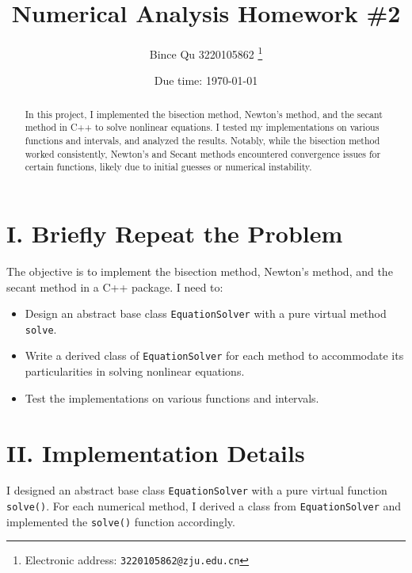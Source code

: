 \documentclass[a4paper]{article}
\begin{document}
\title{Numerical Analysis Homework \#2}

\author{Bince Qu 3220105862
  \thanks{Electronic address: \texttt{3220105862@zju.edu.cn}}}

\date{Due time: \today}

\maketitle

\begin{abstract}
    In this project, I implemented the bisection method, Newton's method, and the secant method in C++ to solve nonlinear equations. I tested my implementations on various functions and intervals, and analyzed the results. Notably, while the bisection method worked consistently, Newton's and Secant methods encountered convergence issues for certain functions, likely due to initial guesses or numerical instability.
\end{abstract}

\section*{I. Briefly Repeat the Problem}

The objective is to implement the bisection method, Newton's method, and the secant method in a C++ package. I need to:

\begin{itemize}
    \item Design an abstract base class \texttt{EquationSolver} with a pure virtual method \texttt{solve}.
    \item Write a derived class of \texttt{EquationSolver} for each method to accommodate its particularities in solving nonlinear equations.
    \item Test the implementations on various functions and intervals.
\end{itemize}

\section*{II. Implementation Details}

I designed an abstract base class \texttt{EquationSolver} with a pure virtual function \texttt{solve()}. For each numerical method, I derived a class from \texttt{EquationSolver} and implemented the \texttt{solve()} function accordingly.
\end{document}
